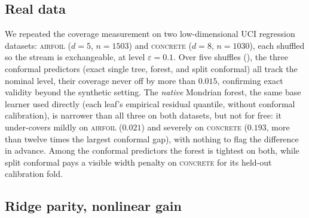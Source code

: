 \documentclass[twoside]{article}
\numberwithin{equation}{section}
\theoremstyle{plain}
\theoremstyle{definition}
\theoremstyle{remark}
\begin{document}
\begin{table}[t]
  \centering
  \small
  
  \caption{Exact knot solver versus grid evaluation (two resolutions) and split
    conformal on the synthetic regression stream ($\varepsilon = 0.1$, $\lambda = 2$);
    standard errors in parentheses.}
  \label{tab:exact}
\end{table}

\subsection{Real data}\label{sec:ill-real}

We repeated the coverage measurement on two low-dimensional UCI regression datasets: \textsc{airfoil} \citep{airfoil_self-noise_291} ($d = 5$, $n = 1503$) and \textsc{concrete} \citep{concrete_compressive_strength_165}
($d = 8$, $n = 1030$), each shuffled so the stream is exchangeable, at level
$\varepsilon=0.1$. Over five shuffles (), the three conformal predictors
(exact single tree, forest, and split conformal) all track the nominal level, their
coverage never off by more than $0.015$, confirming exact validity beyond the synthetic
setting. The \emph{native} Mondrian forest, the same base learner used directly (each
leaf's empirical residual quantile, without conformal calibration), is narrower than all
three on both datasets, but not for free: it under-covers mildly on \textsc{airfoil}
($0.021$) and severely on \textsc{concrete} ($0.193$, more than twelve times the largest
conformal gap), with nothing to flag the difference in advance. Among the conformal
predictors the forest is tightest on both, while split conformal pays a visible width
penalty on \textsc{concrete} for its held-out calibration fold.

\begin{table}[t]
  \centering
  \small
  
  \caption{Coverage and mean interval width (five shuffles; standard errors
    in parentheses) on two exchangeable UCI regression streams at significance level
    $\varepsilon = 0.1$. The conformal predictors attain the nominal level on both
    datasets (coverage within $0.015$ of nominal); the native
    forest is narrower throughout but under-covers on both, mildly on
    \textsc{airfoil} and severely on \textsc{concrete}.}
  \label{tab:realdata}
\end{table}

\subsection{Ridge parity, nonlinear gain}\label{sec:ill-ridge}
\end{document}
